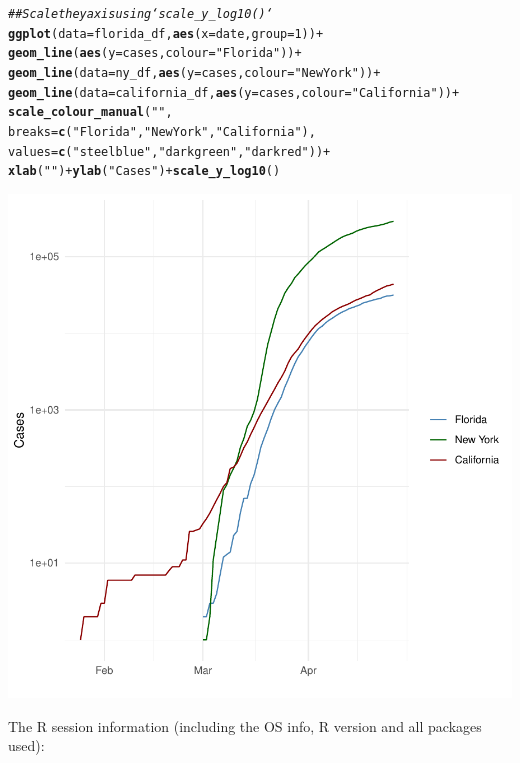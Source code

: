 \documentclass{article}\usepackage[]{graphicx}\usepackage[]{xcolor}
\makeatletter
\newcommand{\hlnum}[1]{\textcolor[rgb]{0.686,0.059,0.569}{#1}}%
\newcommand{\hlstr}[1]{\textcolor[rgb]{0.192,0.494,0.8}{#1}}%
\newcommand{\hlcom}[1]{\textcolor[rgb]{0.678,0.584,0.686}{\textit{#1}}}%
\newcommand{\hlopt}[1]{\textcolor[rgb]{0,0,0}{#1}}%
\newcommand{\hlstd}[1]{\textcolor[rgb]{0.345,0.345,0.345}{#1}}%
\newcommand{\hlkwc}[1]{\textcolor[rgb]{0.333,0.667,0.333}{#1}}%
\newcommand{\hlkwd}[1]{\textcolor[rgb]{0.737,0.353,0.396}{\textbf{#1}}}%
\newenvironment{kframe}{%
 \def\at@end@of@kframe{}%
 \ifinner\ifhmode%
  \def\at@end@of@kframe{\end{minipage}}%
  \begin{minipage}{\columnwidth}%
 \fi\fi%
 \def\FrameCommand##1{\hskip\@totalleftmargin \hskip-\fboxsep
 \colorbox{shadecolor}{##1}\hskip-\fboxsep
     \hskip-\linewidth \hskip-\@totalleftmargin \hskip\columnwidth}%
 \MakeFramed {\advance\hsize-\width
   \@totalleftmargin\z@ \linewidth\hsize
   \@setminipage}}%
 {\par\unskip\endMakeFramed%
 \at@end@of@kframe}
\newenvironment{knitrout}{}{} %
\makeatother
\begin{document}
\begin{knitrout}
\begin{kframe}\begin{alltt}
\hlcom{## Scale the y axis using `scale_y_log10()`}
\hlkwd{ggplot}\hlstd{(}\hlkwc{data}\hlstd{=florida_df,} \hlkwd{aes}\hlstd{(}\hlkwc{x}\hlstd{=date,} \hlkwc{group}\hlstd{=}\hlnum{1}\hlstd{))} \hlopt{+}
  \hlkwd{geom_line}\hlstd{(}\hlkwd{aes}\hlstd{(}\hlkwc{y} \hlstd{= cases,} \hlkwc{colour} \hlstd{=} \hlstr{"Florida"}\hlstd{))} \hlopt{+}
  \hlkwd{geom_line}\hlstd{(}\hlkwc{data}\hlstd{=ny_df,} \hlkwd{aes}\hlstd{(}\hlkwc{y} \hlstd{= cases,}\hlkwc{colour}\hlstd{=}\hlstr{"New York"}\hlstd{))} \hlopt{+}
  \hlkwd{geom_line}\hlstd{(}\hlkwc{data}\hlstd{=california_df,} \hlkwd{aes}\hlstd{(}\hlkwc{y} \hlstd{= cases,} \hlkwc{colour}\hlstd{=}\hlstr{"California"}\hlstd{))} \hlopt{+}
  \hlkwd{scale_colour_manual}\hlstd{(}\hlstr{""}\hlstd{,}
                      \hlkwc{breaks} \hlstd{=} \hlkwd{c}\hlstd{(}\hlstr{"Florida"}\hlstd{,} \hlstr{"New York"}\hlstd{,} \hlstr{"California"}\hlstd{),}
                      \hlkwc{values} \hlstd{=} \hlkwd{c}\hlstd{(}\hlstr{"steelblue"}\hlstd{,} \hlstr{"darkgreen"}\hlstd{,} \hlstr{"darkred"}\hlstd{))} \hlopt{+}
  \hlkwd{xlab}\hlstd{(}\hlstr{" "}\hlstd{)} \hlopt{+} \hlkwd{ylab}\hlstd{(}\hlstr{"Cases"}\hlstd{)} \hlopt{+} \hlkwd{scale_y_log10}\hlstd{()}
\end{alltt}
\end{kframe}

{\centering \includegraphics[width=.6\linewidth]{figure/assignment-06-ReppetoBrian-Rnwauto-report-10} 

}


\end{knitrout}

The R session information (including the OS info, R version and all
packages used):
\end{document}
